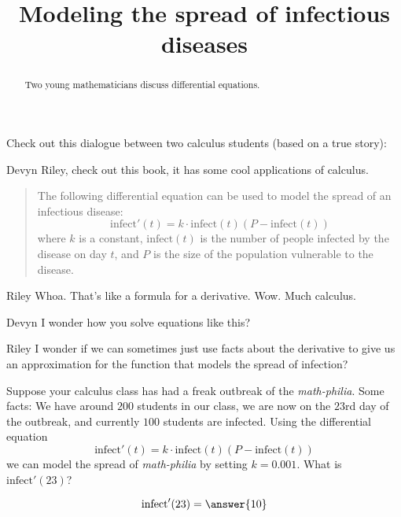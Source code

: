 \documentclass{ximera}
\title[Break-Ground:]{Modeling the spread of infectious diseases}
\begin{document}
\begin{abstract}
  Two young mathematicians discuss differential equations.
\end{abstract}
\maketitle







Check out this dialogue between two calculus students (based on a true
story):

\begin{dialogue}
\item[Devyn] Riley, check out this book, it has some cool applications
  of calculus.
\begin{quote}
  The following differential equation can be used to model the spread
  of an infectious disease:
  \[
  \mathrm{infect}'(t) = k\cdot \mathrm{infect}(t)(P-\mathrm{infect}(t))
  \]
  where $k$ is a constant, $\mathrm{infect}(t)$ is the number of people
  infected by the disease on day $t$, and $P$ is the size of the
  population vulnerable to the disease.
\end{quote}
\item[Riley] Whoa. That's like a formula for a derivative. Wow. Much calculus. 
\item[Devyn] I wonder how you solve equations like this?
\item[Riley] I wonder if we can sometimes just use facts about the
  derivative to give us an approximation for the function that models the spread of infection?
\end{dialogue}



\begin{problem}
  Suppose your calculus class has had a freak outbreak of the
  \textit{math-philia}. Some facts: We have around $200$ students in
  our class, we are now on the $23$rd day of the outbreak, and currently $100$ students are infected. Using the differential
  equation
  \[
  \mathrm{infect}'(t) = k\cdot \mathrm{infect}(t)(P-\mathrm{infect}(t))
  \]
  we can model the spread of \textit{math-philia} by setting $k=0.001$.
  What is $\mathrm{infect}'(23)$?
  \begin{prompt}
    \[
    \mathrm{infect}'(23) = \answer{10}
    \]
  \end{prompt}
\end{problem}
\end{document}
